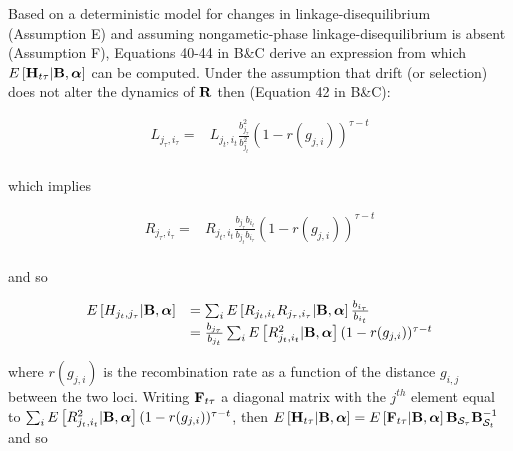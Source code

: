 \documentclass[12pt]{article}
\begin{document}
\begin{bibunit}
Based on a deterministic model for changes in linkage-disequilibrium (Assumption E) and assuming nongametic-phase linkage-disequilibrium is absent (Assumption F), Equations 40-44 in B\&C derive an expression from which $E\left[{\bf H}_{t\tau} | {\bf B}, \boldsymbol{\alpha}\right]$ can be computed. Under the assumption that drift (or selection) does not alter the dynamics of ${\bf R}$ then (Equation 42 in B\&C):

\begin{equation}
\begin{array}{rl}
L_{j_{\tau},i_{\tau}} =& L_{j_t,i_t}\frac{b_{j_\tau}^2}{b_{j_t}^2}(1-r(g_{j,i}))^{\tau-t}\\
\end{array}
\end{equation}

which implies

\begin{equation}
\begin{array}{rl}
R_{j_{\tau},i_{\tau}} =&R_{j_t,i_t}\frac{b_{j_\tau}b_{i_t}}{b_{j_t}b_{i_\tau}}(1-r(g_{j,i}))^{\tau-t}\\
\end{array}
\end{equation}

and so

\begin{equation}
\begin{array}{rl}
E\left[H_{j_t, j_\tau} | {\bf B}, \boldsymbol{\alpha}\right]
&=\sum_i E\left[R_{j_t,i_t}R_{j_{\tau},i_{\tau}} | {\bf B}, \boldsymbol{\alpha}\right]\frac{b_{i_\tau}}{b_{i_t}}\\
&=\frac{b_{j_\tau}}{b_{j_t}}\sum_i E\left[R_{j_t,i_t}^2 | {\bf B}, \boldsymbol{\alpha}\right](1-r(g_{j,i}))^{\tau-t}\\
\end{array}
\end{equation}


where $r(g_{j,i})$ is the recombination rate as a function of the distance $g_{i,j}$ between the two loci. Writing ${\bf F}_{t\tau}$ a diagonal matrix with the $j^{th}$ element equal to
$\sum_i E\left[R_{j_t,i_t}^2 | {\bf B}, \boldsymbol{\alpha}\right](1-r(g_{j,i}))^{\tau-t}$, then $E\left[{\bf H}_{t\tau} | {\bf B}, \boldsymbol{\alpha}\right]= E\left[{\bf F}_{t\tau} | {\bf B}, \boldsymbol{\alpha}\right]{\bf B}_{\mathcal{S}_\tau}{\bf B}_{\mathcal{S}_t}^{-1}$ and so


\end{bibunit}
\end{document}
